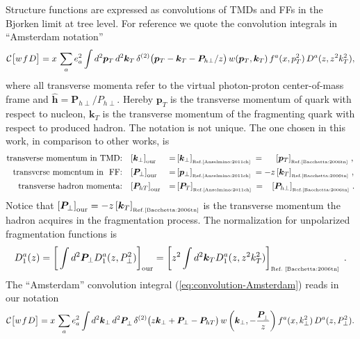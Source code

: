 \documentclass[a4paper,11pt]{article}
\newcommand{\be}{\begin{equation}}
\newcommand{\ee}{\end{equation}}
\newcommand{\slim}{\mskip 1.5mu}       %
\def\bfkperp{{\bm k}_\perp}
\def\bfpperp{{\bm P}_\perp}
\def\bfhp{\hat{\bm h}}
\def\bfPhperp{{\bm P}_{hT}}
\def\kperp{k_\perp}
\def\pperp{P_\perp}
\begin{document}
Structure functions are expressed as convolutions of TMDs and FFs
in the Bjorken limit at tree level. For reference we quote the
convolution integrals in ``Amsterdam notation'' \cite{Bacchetta:2006tn}
\be
	{\cal C}\bigl[ w\slim f\slim D \bigr]
	=  x \, \sum_a e_a^2 \int d^2 {\bm p}_T \,  d^2 {\bm k}_T
	\, \delta^{(2)}\bigl({\bm p}_T - {\bm k}_T - {\bm P}_{h \perp}/z \bigr)
	\,w({\bm p}_T,{\bm k}_T)\,
	f^a( x ,p_T^2)\,D^a(z,z^2 k_T^2) , \label{eq:convolution-Amsterdam}
\ee
where all transverse momenta refer to the virtual photon-proton
center-of-mass frame and $\bfhp  ={\bm P}_{h \perp}/{P}_{h\perp}$.
Hereby ${\bm p}_T$ is
the transverse momentum of quark with respect to nucleon,
${\bm k}_T$ is the transverse momentum of the fragmenting quark
with respect to produced hadron. The notation is not unique.
The one chosen in this work, in comparison to other works, is
\begin{alignat}{3}
	\mbox{transverse momentum in TMD:}\;\;\;&
    	\left[\bfkperp\right]_{\rm our}
    &=& 	\left[{\bm k}_\perp\right]_{\mbox{\tiny Ref.\cite{Anselmino:2011ch}}} \;
    =  	\;\;\;\;\;\left[{\bm p}_T\right]_{\mbox{\tiny Ref.\cite{Bacchetta:2006tn}}}\,,
	\\
	\mbox{transverse momentum in \ FF:}\;\;\;&
	\left[\bfpperp\right]_{\rm our}
    &=& 	\left[{\bm p}_\perp\right]_{\mbox{\tiny Ref.\cite{Anselmino:2011ch}}} \;
    =  	-z\left[{\bm k}_T\right]_{\mbox{\tiny Ref.\cite{Bacchetta:2006tn}}}\,,
	\\
	\mbox{transverse hadron momenta:}\;\;\;&
    	\left[\bfPhperp\right]_{\rm our}
    &=&	\left[{\bm P}_T\right]_{\mbox{\tiny Ref.\cite{Anselmino:2011ch}}} \;
    =  	\;\;\;\left[{\bm P}_{h\perp}\right]_{\mbox{\tiny Ref.\cite{Bacchetta:2006tn}}}\,.
\end{alignat}
Notice that
$\left[\bfpperp\right]_{\rm our}=
-z\left[{\bm k}_T\right]_{\mbox{\tiny Ref.\cite{Bacchetta:2006tn}}}$
is the transverse momentum the hadron acquires in the fragmentation process.
The normalization for unpolarized fragmentation functions is
\be
	D_1^a(z)
	= \left[\,\int d^2{\bm P}_\perp D_1^a(z,P_\perp^2)\right]_{\rm our}
	= \left[z^2\int d^2{\bm k}_TD_1^a(z, z^2  k_T^2)
	  \right]_{\mbox{\tiny Ref.~\cite{Bacchetta:2006tn}}}
	\label{eq:D1}\;.
\ee
The ``Amsterdam'' convolution integral (\ref{eq:convolution-Amsterdam})
reads in our notation
\be
	{\cal C}\bigl[ w\slim f\slim D \bigr]
	=  x \,
	\sum_a e_a^2 \int d^2 \bfkperp\,  d^2 \bfpperp^{ }
	\, \delta^{(2)}\bigl(z\bfkperp + \bfpperp - \bfPhperp \bigr)
	\,w\left(\bfkperp,-\frac{\bfpperp^{ }}{z}\right)
	f^a( x ,\kperp^2)\,D^a(z,\pperp^2) . \label{eq:convolution_our}
\ee
\end{document}
